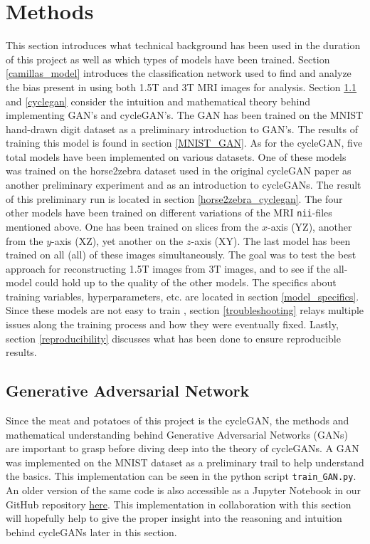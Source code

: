 \documentclass[12pt, fleqn, titlepage]{article}
\begin{document}
\section{Methods}
This section introduces what technical background has been used in the duration of this project as well as which types of models have been trained. Section \ref{camillas_model} introduces the classification network used to find and analyze the bias present in using both 1.5T and 3T MRI images for analysis. Section \ref{gan} and \ref{cyclegan} consider the intuition and mathematical theory behind implementing GAN's and cycleGAN's. The GAN has been trained on the MNIST hand-drawn digit dataset as a preliminary introduction to GAN's. The results of training this model is found in section \ref{MNIST_GAN}. As for the cycleGAN, five total models have been implemented on various datasets. One of these models was trained on the horse2zebra dataset used in the original cycleGAN paper \cite{original_cyclegan} as another preliminary experiment and as an introduction to cycleGANs. The result of this preliminary run is located in section \ref{horse2zebra_cyclegan}. The four other models have been trained on different variations of the MRI \texttt{nii}-files %
 mentioned above. One has been trained on slices from the $x$-axis (YZ), another from the $y$-axis (XZ), yet another on the $z$-axis (XY). The last model has been trained on all (all) of these images simultaneously. The goal was to test the best approach for reconstructing 1.5T images from 3T images, and to see if the all-model could hold up to the quality of the other models. The specifics about training variables, hyperparameters, etc. are located in section \ref{model_specifics}. Since these models are not easy to train \cite{hard_to_train}, section \ref{troubleshooting} relays multiple issues along the training process and how they were eventually fixed. Lastly, section \ref{reproducibility} discusses what has been done to ensure reproducible results.



\subsection{Generative Adversarial Network}\label{gan}
Since the meat and potatoes of this project is the cycleGAN, the methods and mathematical understanding behind Generative Adversarial Networks (GANs) are important to grasp before diving deep into the theory of cycleGANs. A GAN was implemented on the MNIST dataset as a preliminary trail to help understand the basics. This implementation can be seen in the python script \texttt{train\_GAN.py}. An older version of the same code is also accessible as a Jupyter Notebook in our GitHub repository  \href{https://github.com/oskarwiese/AlzPred/blob/main/preliminary/GAN_MNIST.ipynb}{here}. This implementation in collaboration with this section will hopefully help to give the proper insight into the reasoning and intuition behind cycleGANs later in this section.
\end{document}
